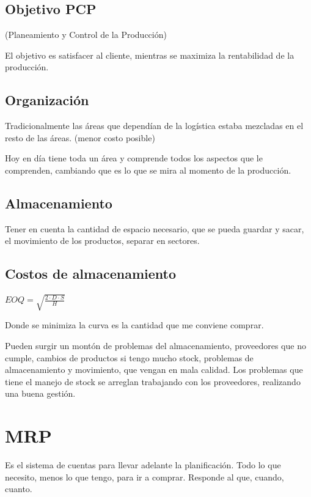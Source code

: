 \documentclass[titlepage,a4paper]{article}
\begin{document}
\subsection*{Objetivo PCP}
(Planeamiento y Control de la Producción)

El objetivo es satisfacer al cliente, mientras se maximiza la rentabilidad de la producción.

\subsection{Organización}

Tradicionalmente las áreas que dependían de la logística estaba mezcladas en el resto de las áreas. (menor costo posible)

Hoy en día tiene toda un área y comprende todos los aspectos que le comprenden, cambiando que es lo que se mira al momento de la producción.

\subsection{Almacenamiento}

Tener en cuenta la cantidad de espacio necesario, que se pueda guardar y sacar, el movimiento de los productos, separar en sectores.

\subsection{Costos de almacenamiento}

\begin{math}
EOQ = \sqrt{\frac{2 \cdot D \cdot S}{H}}
\end{math}

\medskip

Donde se minimiza la curva es la cantidad que me conviene comprar.


Pueden surgir un montón de problemas del almacenamiento, proveedores que no cumple, cambios de productos si tengo mucho stock, problemas de almacenamiento y movimiento, que vengan en mala calidad. Los problemas que tiene el manejo de stock se arreglan trabajando con los proveedores, realizando una buena gestión.

\section{MRP}
Es el sistema de cuentas para llevar adelante la planificación. Todo lo que necesito, menos lo que tengo, para ir a comprar. Responde al que, cuando, cuanto.
\end{document}
